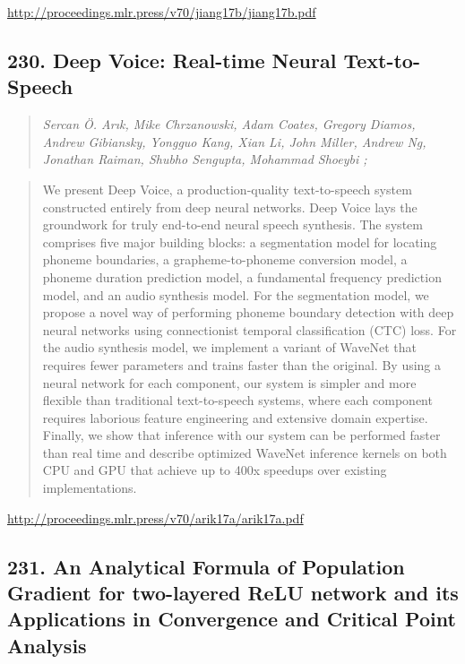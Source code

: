 \documentclass{article}
\begin{document}
\href{http://proceedings.mlr.press/v70/jiang17b/jiang17b.pdf}{http://proceedings.mlr.press/v70/jiang17b/jiang17b.pdf}

\subsection{230. Deep Voice: Real-time Neural Text-to-Speech}

\begin{quote}
\footnotesize{\textit{Sercan Ö. Arık, Mike Chrzanowski, Adam Coates, Gregory Diamos, Andrew Gibiansky, Yongguo Kang, Xian Li, John Miller, Andrew Ng, Jonathan Raiman, Shubho Sengupta, Mohammad Shoeybi ;}}

\end{quote}

\begin{quote}
    We present Deep Voice, a production-quality text-to-speech system constructed entirely from deep neural networks. Deep Voice lays the groundwork for truly end-to-end neural speech synthesis. The system comprises five major building blocks: a segmentation model for locating phoneme boundaries, a grapheme-to-phoneme conversion model, a phoneme duration prediction model, a fundamental frequency prediction model, and an audio synthesis model. For the segmentation model, we propose a novel way of performing phoneme boundary detection with deep neural networks using connectionist temporal classification (CTC) loss. For the audio synthesis model, we implement a variant of WaveNet that requires fewer parameters and trains faster than the original. By using a neural network for each component, our system is simpler and more flexible than traditional text-to-speech systems, where each component requires laborious feature engineering and extensive domain expertise. Finally, we show that inference with our system can be performed faster than real time and describe optimized WaveNet inference kernels on both CPU and GPU that achieve up to 400x speedups over existing implementations.  
\end{quote}

\href{http://proceedings.mlr.press/v70/arik17a/arik17a.pdf}{http://proceedings.mlr.press/v70/arik17a/arik17a.pdf}

\subsection{231. An Analytical Formula of Population Gradient for two-layered ReLU network and its Applications in Convergence and Critical Point Analysis}
\end{document}
